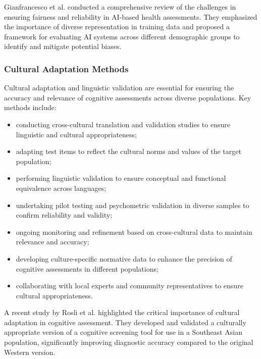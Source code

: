 Gianfrancesco et al. \cite{Gianfrancesco2018} conducted a comprehensive review of the challenges in ensuring fairness and reliability in AI-based health assessments. They emphasized the importance of diverse representation in training data and proposed a framework for evaluating AI systems across different demographic groups to identify and mitigate potential biases.

\subsubsection{Cultural Adaptation Methods}
Cultural adaptation and linguistic validation are essential for ensuring the accuracy and relevance of cognitive assessments across diverse populations. Key methods include:
\begin{itemize}
\item conducting cross-cultural translation and validation studies to ensure linguistic and cultural appropriateness;
\item adapting test items to reflect the cultural norms and values of the target population;
\item performing linguistic validation to ensure conceptual and functional equivalence across languages;
\item undertaking pilot testing and psychometric validation in diverse samples to confirm reliability and validity;
\item ongoing monitoring and refinement based on cross-cultural data to maintain relevance and accuracy;
\item developing culture-specific normative data to enhance the precision of cognitive assessments in different populations;
\item collaborating with local experts and community representatives to ensure cultural appropriateness.
\end{itemize}

A recent study by Rosli et al. \cite{Rosli2021} highlighted the critical importance of cultural adaptation in cognitive assessment. They developed and validated a culturally appropriate version of a cognitive screening tool for use in a Southeast Asian population, significantly improving diagnostic accuracy compared to the original Western version.

